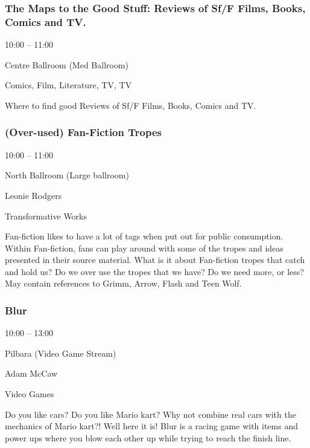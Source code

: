 \documentclass{scrreprt}
\begin{document}
\begin{multicols}{2}
\subsubsection*{The Maps to the Good Stuff: Reviews of Sf/F Films, Books, Comics and TV.}\begin{description}
\setlength{\itemsep}{0pt}
\setlength{\parsep}{0pt}
\setlength{\parskip}{0pt}
\item[Time:]{10:00 -- 11:00}
\item[Venue:]{Centre Ballroom (Med Ballroom)}
\item[Tags:]{Comics, Film, Literature, TV, TV}\end{description}
Where to find good Reviews of Sf/F Films, Books, Comics and TV.
\subsubsection*{(Over-used) Fan-Fiction Tropes}\begin{description}
\setlength{\itemsep}{0pt}
\setlength{\parsep}{0pt}
\setlength{\parskip}{0pt}
\item[Time:]{10:00 -- 11:00}
\item[Venue:]{North Ballroom (Large ballroom)}
\item[People:]{Leonie Rodgers}
\item[Tags:]{Transformative Works}\end{description}
Fan-fiction likes to have a lot of tags when put out for public consumption. Within Fan-fiction, fans can play around with some of the tropes and ideas presented in their source material. What is it about Fan-fiction tropes that catch and hold us? Do we over use the tropes that we have? Do we need more, or less? May contain references to Grimm, Arrow, Flash and Teen Wolf.
\subsubsection*{Blur}\begin{description}
\setlength{\itemsep}{0pt}
\setlength{\parsep}{0pt}
\setlength{\parskip}{0pt}
\item[Time:]{10:00 -- 13:00}
\item[Venue:]{Pilbara (Video Game Stream)}
\item[People:]{Adam McCaw}
\item[Tags:]{Video Games}\end{description}
Do you like cars? Do you like Mario kart? Why not combine real cars with the mechanics of Mario kart?! Well here it is! Blur is a racing game with items and power ups where you blow each other up while trying to reach the finish line.

\end{multicols}
\end{document}
